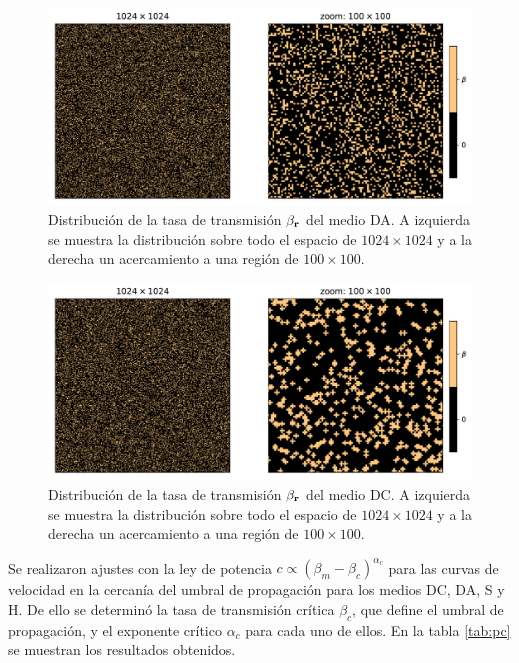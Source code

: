 \begin{figure}[t]
    \centering
    \includegraphics[width=\imsize]{beta_al_zoom.pdf}
    \caption{Distribución de la tasa de transmisión $\beta_{\vb r}$ del medio DA. A izquierda se muestra la distribución sobre 
    todo el espacio de $1024\times1024$ y a la derecha un acercamiento a una región de $100\times100$.}
    \label{beta_al_zoom}
\end{figure}
\begin{figure}[t]
    \centering
    \includegraphics[width=\imsize]{beta_dic_zoom.pdf}
    \caption{Distribución de la tasa de transmisión $\beta_{\vb r}$ del medio DC. A izquierda se muestra la distribución sobre 
    todo el espacio de $1024\times1024$ y a la derecha un acercamiento a una región de $100\times100$.}
    \label{beta_dic_zoom}
\end{figure}

Se realizaron ajustes con la ley de potencia $c\propto(\beta_m-\beta_c)^{\alpha_c}$ para las curvas de velocidad en la cercanía del umbral de propagación para los medios DC, DA, S y H. De ello se determinó la tasa de transmisión crítica $\beta_c$, que define el umbral de propagación, y el exponente crítico $\alpha_c$ para cada uno de ellos. En la tabla \ref{tab:pc} se muestran los resultados obtenidos.

